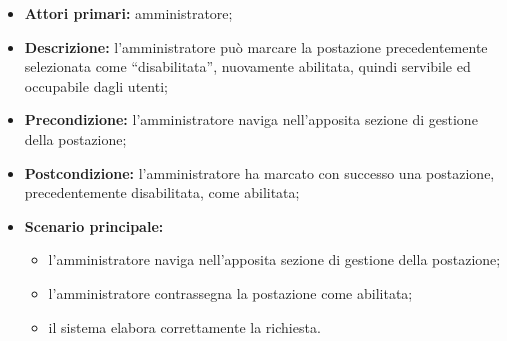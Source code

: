 \begin{itemize}
\item \textbf{Attori primari:} amministratore;
\item \textbf{Descrizione:} l’amministratore può marcare la postazione precedentemente selezionata come “disabilitata”, nuovamente abilitata, quindi servibile ed occupabile dagli utenti;
\item \textbf{Precondizione:} l’amministratore naviga nell’apposita sezione di gestione della postazione; 
\item \textbf{Postcondizione:} l’amministratore ha marcato con successo una postazione, precedentemente disabilitata, come abilitata;
\item \textbf{Scenario principale:} 
	\begin{itemize}
		\item l’amministratore naviga nell’apposita sezione di gestione della postazione;
		\item l’amministratore contrassegna la postazione come abilitata;
		\item il sistema elabora correttamente la richiesta.
	\end{itemize}
\end{itemize}
